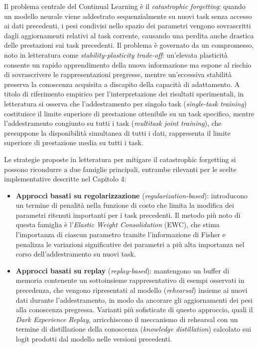 \documentclass[12pt,a4paper]{report}
\begin{document}
Il problema centrale del Continual Learning è il \emph{catastrophic forgetting}: quando un modello neurale viene addestrato sequenzialmente su nuovi task senza accesso ai dati precedenti, i pesi condivisi nello spazio dei parametri vengono sovrascritti dagli aggiornamenti relativi al task corrente, causando una perdita anche drastica delle prestazioni sui task precedenti. Il problema è governato da un compromesso, noto in letteratura come \emph{stability-plasticity trade-off}: un'elevata plasticità consente un rapido apprendimento della nuova informazione ma espone al rischio di sovrascrivere le rappresentazioni pregresse, mentre un'eccessiva stabilità preserva la conoscenza acquisita a discapito della capacità di adattamento. A titolo di riferimento empirico per l'interpretazione dei risultati sperimentali, in letteratura si osserva che l'addestramento per singolo task (\emph{single-task training}) costituisce il limite superiore di prestazione ottenibile su un task specifico, mentre l'addestramento congiunto su tutti i task (\emph{multitask joint training}), che presuppone la disponibilità simultanea di tutti i dati, rappresenta il limite superiore di prestazione media su tutti i task.

Le strategie proposte in letteratura per mitigare il catastrophic forgetting si possono ricondurre a due famiglie principali, entrambe rilevanti per le scelte implementative descritte nel Capitolo 4:

\begin{itemize}
    \item \textbf{Approcci basati su regolarizzazione} (\emph{regularization-based}): introducono un termine di penalità nella funzione di costo che limita la modifica dei parametri ritenuti importanti per i task precedenti. Il metodo più noto di questa famiglia è l'\emph{Elastic Weight Consolidation} (EWC), che stima l'importanza di ciascun parametro tramite l'informazione di Fisher e penalizza le variazioni significative dei parametri a più alta importanza nel corso dell'addestramento su nuovi task.
    \item \textbf{Approcci basati su replay} (\emph{replay-based}): mantengono un buffer di memoria contenente un sottoinsieme rappresentativo di esempi osservati in precedenza, che vengono ripresentati al modello (\emph{rehearsal}) insieme ai nuovi dati durante l'addestramento, in modo da ancorare gli aggiornamenti dei pesi alla conoscenza pregressa. Varianti più sofisticate di questo approccio, quali il \emph{Dark Experience Replay}, arricchiscono il meccanismo di rehearsal con un termine di distillazione della conoscenza (\emph{knowledge distillation}) calcolato sui logit prodotti dal modello nelle versioni precedenti.
\end{itemize}
\end{document}
